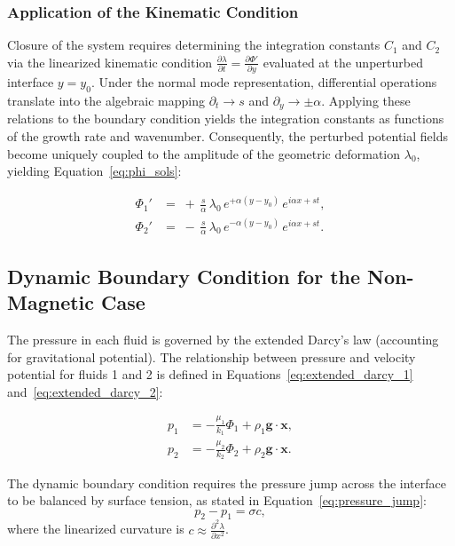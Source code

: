\subsubsection{Application of the Kinematic Condition}

Closure of the system requires determining the integration constants $C_1$ and $C_2$ via the linearized kinematic condition $\frac{\partial \lambda}{\partial t} = \frac{\partial \Phi'}{\partial y}$ evaluated at the unperturbed interface $y = y_0$. Under the normal mode representation, differential operations translate into the algebraic mapping $\partial_t \to s$ and $\partial_y \to \pm \alpha$. Applying these relations to the boundary condition yields the integration constants as functions of the growth rate and wavenumber. Consequently, the perturbed potential fields become uniquely coupled to the amplitude of the geometric deformation $\lambda_0$, yielding Equation~\ref{eq:phi_sols}:

\begin{equation} \label{eq:phi_sols}
\begin{aligned}
\Phi_1' &= \;+\,\frac{s}{\alpha}\,\lambda_0 \,e^{+\alpha(y-y_0)} \,e^{i\alpha x + st}, \\
\Phi_2' &= \;-\,\frac{s}{\alpha}\,\lambda_0 \,e^{-\alpha(y-y_0)} \,e^{i\alpha x + st}.
\end{aligned}
\end{equation}

\subsection{Dynamic Boundary Condition for the Non-Magnetic Case}

The pressure in each fluid is governed by the extended Darcy's law (accounting for gravitational potential). The relationship between pressure and velocity potential for fluids 1 and 2 is defined in Equations~\ref{eq:extended_darcy_1} and~\ref{eq:extended_darcy_2}:

\begin{align}
    p_1 &= -\frac{\mu_1}{k_1} \Phi_1 + \rho_1 \mathbf{g} \cdot \mathbf{x}, \label{eq:extended_darcy_1} \\
    p_2 &= -\frac{\mu_2}{k_2} \Phi_2 + \rho_2 \mathbf{g} \cdot \mathbf{x}. \label{eq:extended_darcy_2}
\end{align}

The dynamic boundary condition requires the pressure jump across the interface to be balanced by surface tension, as stated in Equation~\ref{eq:pressure_jump}:
\begin{equation} \label{eq:pressure_jump}
    p_2 - p_1 = \sigma c,
\end{equation}
where the linearized curvature is $c \approx \frac{\partial^2 \lambda}{\partial x^2}$.

